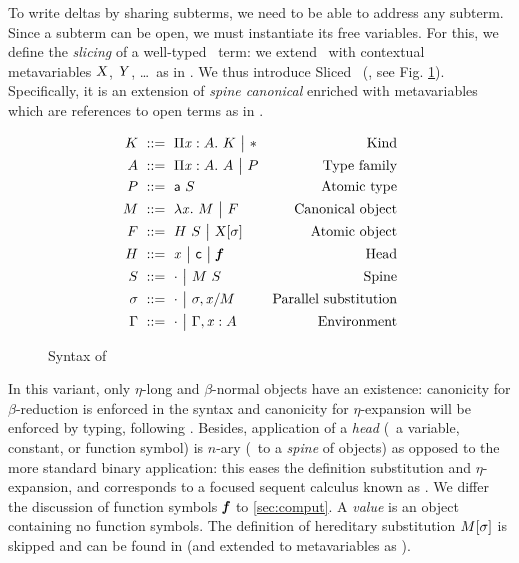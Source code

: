\documentclass{llncs}
\begin{document}
To write deltas by sharing subterms, we need to be able to address any
subterm. Since a subterm can be open, we must instantiate its free
variables. For this, we define the \emph{slicing} of a well-typed \LF\
term: we extend \LF\ with contextual metavariables $\text{\textsl{X}}$, $\text{\textsl{Y}}$, \ldots\ as in \cite{nanevski2008contextual}. We thus introduce
Sliced \LF\ (\SLF, see Fig. \ref{fig:syntax-LF}). Specifically, it is
an extension of \emph{spine canonical \LF} \cite{pfenning2007term}
enriched with metavariables which are references to open terms as in
\cite{nanevski2008contextual}.

\begin{figure}\centering
  \begin{align*}
    K &\ ::=\  \Pi{\ensuremath{\text{\textit{x}}}}:{A}.\  K \ {\big|}\  \mathsf{*} &
    \text{Kind}\\
    A &\ ::=\  \Pi{\ensuremath{\text{\textit{x}}}}:{A}.\  A \ {\big|}\  P &
    \text{Type family} \\
    P &\ ::=\  {\text{\textsf{a}}}\  S &
    \text{Atomic type} \\
    M &\ ::=\  \lambda{\ensuremath{\text{\textit{x}}}}.\  M \ {\big|}\  F &
    \text{Canonical object} \\
    F &\ ::=\  {H}\  S \ {\big|}\  {\text{\textsl{X}}}[{\sigma}] &
    \text{Atomic object} \\
    H &\ ::=\  \text{\textit{x}} \ {\big|}\  \text{\textsf{c}} \ {\big|}\  \text{\textit{\textbf{f}}} &
    \text{Head}\\
    S &\ ::=\  \cdot \ {\big|}\  {M}\ {S} &
    \text{Spine}\\
    \sigma &\ ::=\  \cdot \ {\big|}\  {\sigma},{{\text{\textit{x}}}/{M}} &
    \text{Parallel substitution} \\
    \Gamma &\ ::=\  \cdot \ {\big|}\  {\Gamma},{{\text{\textit{x}}}:{A}} &
    \text{Environment}
  \end{align*}
  \caption{Syntax of \SLF}
  \label{fig:syntax-LF}
\end{figure}

In this variant, only $\eta$-long and $\beta$-normal objects have an
existence: canonicity for $\beta$-reduction is enforced in the syntax
and canonicity for $\eta$-expansion will be enforced by typing,
following \cite{hl07mechanizing}. Besides, application of a
\emph{head} (\ie\ a variable, constant, or function symbol) is $n$-ary
(\ie\ to a \emph{spine} of objects) as opposed to the more standard
binary application: this eases the definition substitution and
$\eta$-expansion, and corresponds to a focused sequent calculus known
as \sysname{LJT} \cite{herbelin1995λ}. We differ the discussion of
function symbols $\text{\textit{\textbf{f}}}$ to \ref{sec:comput}. A \emph{value} is an
object containing no function symbols. The definition of hereditary
substitution ${M}[{\sigma}]$ is skipped and can be found in
\cite{pfenning2007term} (and extended to metavariables as
\cite{nanevski2008contextual}).
\end{document}
